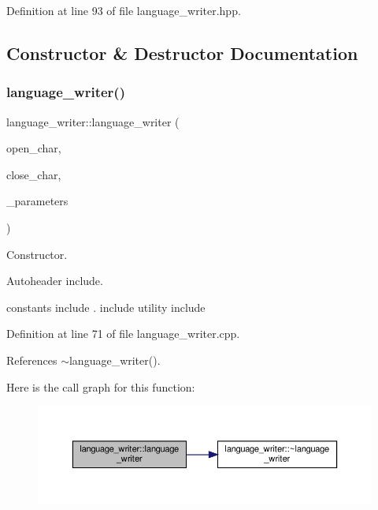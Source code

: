 Definition at line 93 of file language\+\_\+writer.\+hpp.



\subsection{Constructor \& Destructor Documentation}
\mbox{\label{classlanguage__writer_a9eb0746b5252aea753ed97772a58d274}} 
\subsubsection{\texorpdfstring{language\+\_\+writer()}{language\_writer()}}
{\footnotesize\ttfamily language\+\_\+writer\+::language\+\_\+writer (\begin{DoxyParamCaption}\item[{char}]{open\+\_\+char,  }\item[{char}]{close\+\_\+char,  }\item[{const \hyperlink{Parameter_8hpp_a37841774a6fcb479b597fdf8955eb4ea}{Parameter\+Const\+Ref}}]{\+\_\+parameters }\end{DoxyParamCaption})}



Constructor. 

Autoheader include.

constants include . include utility include 

Definition at line 71 of file language\+\_\+writer.\+cpp.



References $\sim$language\+\_\+writer().

Here is the call graph for this function\+:
\nopagebreak
\begin{figure}[H]
\begin{center}
\leavevmode
\includegraphics[width=350pt]{d6/d67/classlanguage__writer_a9eb0746b5252aea753ed97772a58d274_cgraph}
\end{center}
\end{figure}
\mbox{\label{classlanguage__writer_ae8acf0e28cb5fcd69ef12a32dc019232}} 
